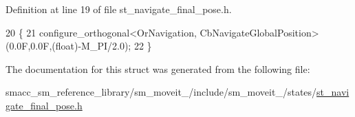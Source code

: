 Definition at line 19 of file st\+\_\+navigate\+\_\+final\+\_\+pose.\+h.


\begin{DoxyCode}
20     \{
21         configure\_orthogonal<OrNavigation, CbNavigateGlobalPosition>(0.0F,0.0F,(float)-M\_PI/2.0);
22     \}
\end{DoxyCode}


The documentation for this struct was generated from the following file\+:\begin{DoxyCompactItemize}
\item 
smacc\+\_\+sm\+\_\+reference\+\_\+library/sm\+\_\+moveit\+\_/include/sm\+\_\+moveit\+\_/states/\hyperlink{st__navigate__final__pose_8h}{st\+\_\+navigate\+\_\+final\+\_\+pose.\+h}\end{DoxyCompactItemize}
